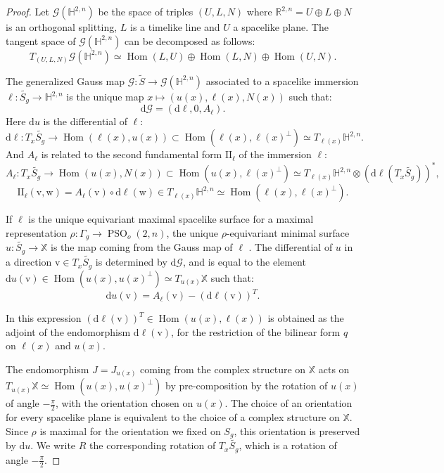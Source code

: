 \documentclass[reqno,10pt]{amsart}
\theoremstyle{plain}
\theoremstyle{definition}
\theoremstyle{remark}
\newcommand{\R}{\mathbb{R}}
\newcommand{\transpose}[1]{\ensuremath{#1^{\scriptscriptstyle T}}}
\DeclareMathOperator{\Hom}{Hom}
\DeclareMathOperator{\PSO}{PSO}
\newcommand{\II}{\mathrm{I\!I}}
\newcommand{\X}{\mathbb{X}}
\begin{document}
\begin{proof}
Let $\mathcal{G}(\mathbb{H}^{2,n})$ be the space of triples $(U,L,N)$ where $\R^{2,n}=U\oplus L  \oplus N$ is an orthogonal splitting, $L$ is a timelike line and $U$ a spacelike plane. The tangent space of $\mathcal{G}(\mathbb{H}^{2,n})$ can be decomposed as follows:
$$T_{(U,L,N)}\mathcal{G}\left(\mathbb{H}^{2,n}\right)\simeq \Hom\left(L,U\right)\oplus\Hom\left( L,N\right) \oplus \Hom\left(U,N\right).$$

The generalized Gauss map $\mathcal{G}:\widetilde{S} \to \mathcal{G}(\mathbb{H}^{2,n})$ associated to a spacelike immersion $\ell:\widetilde{S_g}\to \mathbb{H}^{2,n}$ is the unique map $x\mapsto (u(x),\ell(x),N(x))$ such that:
$$\mathrm{d}\mathcal{G}=(\mathrm{d}\ell ,0,A_\ell).$$
 Here $\mathrm{d}u$ is the differential of $\ell$:
$$\mathrm{d}\ell:T_x\widetilde{S_g}\to \Hom(\ell(x),u(x))\subset \Hom(\ell(x),\ell(x)^\perp)\simeq T_{\ell(x)}\mathbb{H}^{2,n}.$$
And $A_\ell$ is related to the second fundamental form $\II_\ell$ of the immersion $\ell$:
$$A_\ell:T_x\widetilde{S_g}\to \Hom(u(x),N(x))\subset \Hom(u(x),\ell(x)^\perp)\simeq T_{\ell(x)}\mathbb{H}^{2,n}\otimes\left( \mathrm{d}\ell \left(T_x\widetilde{S_g}\right)\right)^*,$$
$$\II_\ell(\mathrm{v},\mathrm{w})=A_\ell(\mathrm{v})\circ\mathrm{d}\ell(\mathrm{w})\in T_{\ell(x)}\mathbb{H}^{2,n}\simeq \Hom\left(\ell(x),\ell(x)^\perp\right).$$

If $\ell$ is the unique equivariant maximal spacelike surface for a maximal representation $\rho:\Gamma_g\to \PSO_o(2,n)$, the unique $\rho$-equivariant minimal surface $u:\widetilde{S_g}\to \X$ is the map coming from the Gauss map of $\ell$ \cite{Collier_2019}. The differential of $u$ in a direction $\mathrm{v}\in T_x\widetilde{S_g}$ is determined by $\mathrm{d}\mathcal{G}$, and is equal to the element $\mathrm{d}u(\mathrm{v})\in \Hom\left(u(x),u(x)^\perp\right)\simeq T_{u(x)}\X$ such that:
$$\mathrm{d}u(\mathrm{v})=A_\ell(\mathrm{v})-\transpose{\left(\mathrm{d}\ell(\mathrm{v})\right)}.$$

In this expression $\transpose{\left(\mathrm{d}\ell(\mathrm{v})\right)}\in \Hom\left(u(x),\ell(x)\right)$ is obtained as the adjoint of the endomorphism $\mathrm{d}\ell(\mathrm{v})$, for the restriction of the bilinear form $q$ on $\ell(x)$ and $u(x)$. 
\medskip

The endomorphism $J=J_{u(x)}$ coming from the complex structure on $\X$ acts on $T_{u(x)}\X\simeq \Hom\left(u(x),u(x)^\perp\right)$ by pre-composition by the rotation of $u(x)$ of angle $-\frac{\pi}{2}$, with the orientation chosen on $u(x)$. The choice of an orientation for every spacelike plane is equivalent to the choice of a complex structure on $\X$.
Since $\rho$ is maximal for the orientation we fixed on $S_g$,  this orientation is preserved by $\mathrm{d}u$. We write $R$ the corresponding rotation of $T_x\widetilde{S_g}$, which is a rotation of angle $-\frac{\pi}{2}$.


\end{proof}
\end{document}
